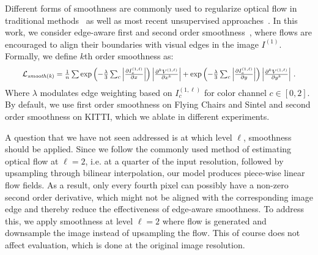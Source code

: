 \documentclass[runningheads]{llncs}
\newcommand{\abs}[1]{\left\lvert#1\right\rvert}
\newcommand{\mean}[1]{\frac{1}{n} \sum #1}
\newcommand{\lossfun}[1]{\mathcal{L}_\mathit{#1}}
\newcommand{\level}{\ell}
\begin{document}
 Different forms of smoothness are commonly used to regularize optical flow in traditional methods~\cite{Brox04,Horn1981,Sun2010} as well as most recent unsupervised approaches~\cite{jjyu2016unsupflow,ren2017unsupervised,wang2018occlusion,meister2018unflow,yin2018geonet,zou2018dfnet,ranjan2019cvpr,Janai2018ECCV,wang2018unos,Zhong2019UnsupervisedDE}. In this work, we consider edge-aware first and second order smoothness~\cite{tomasi1998bilateral}, where flows are encouraged to align their boundaries with visual edges in the image $I^{(1)}$. Formally, we define $k$th order smoothness as:
\begin{equation}
\resizebox{0.93\linewidth}{!}{$
\lossfun{smooth(k)} =
\mean{ \exp {\left(- \frac{\lambda}{3} \sum_c \abs{\frac{\partial I_c^{(1, \level)}}{\partial x}}\right)} \abs{ \frac{\partial^k V^{(1, \level)}}{\partial x^k} } + \exp {\left(-\frac{\lambda}{3}\sum_c\abs{\frac{\partial I_c^{(1, \level)}}{\partial y}}\right)} \abs{\frac{\partial^k V^{(1, \level)}}{\partial y^k}}}\,.
$}
\label{eq:smooth}
\end{equation}
Where $\lambda$ modulates edge weighting based on $I^{(1, \level)}_c$ for color channel $c\in[0,2]$. By default, we use first order smoothness on Flying Chairs and Sintel and second order smoothness on KITTI, which we ablate in different experiments.

 A question that we have not seen addressed is at which level $\level$, smoothness should be applied. Since we follow the commonly used method of estimating optical flow at $\level=2$, i.e. at a quarter of the input resolution, followed by upsampling through bilinear interpolation, our model produces piece-wise linear flow fields. As a result, only every fourth pixel can possibly have a non-zero second order derivative, which might not be aligned with the corresponding image edge and thereby reduce the effectiveness of edge-aware smoothness. To address this, we apply smoothness at level $\level=2$ where flow is generated and downsample the image instead of upsampling the flow. This of course does not affect evaluation, which is done at the original image resolution.
\end{document}
